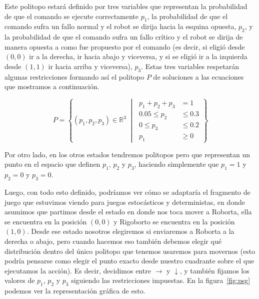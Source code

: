 Este politopo estará definido por tres variables que representan la
probabilidad de que el comando se ejecute correctamente $p_1$, la probabilidad
de que el comando sufra un fallo normal y el robot se dirija hacia la esquina
opuesta, $p_2$, y la probabilidad de que el comando sufra un fallo crítico y el
robot se dirija de manera opuesta a como fue propuesto por el comando (es
decir, si eligió desde $(0,0)$ ir a la derecha, ir hacia abajo y viceversa, y
si se eligió ir a la izquierda desde $(1,1)$ ir hacia arriba y viceversa),
$p_3$. Estas tres variables respetarán algunas restricciones formando así el
politopo $P$ de soluciones a las ecuaciones que mostramos a continuación.

\[
	P = \left\{ (p_1, p_2, p_3) \in \mathbb{R}^3 \;\middle|\;
	\begin{aligned}
		p_1 + p_2 + p_3 &= 1 \\
		0.05 \leq p_2 &\leq 0.3 \\
		0 \leq p_3 &\leq 0.2 \\
		p_1 &\geq 0
	\end{aligned}
	\right\}
\]

Por otro lado, en los otros estados tendremos politopos pero que representan un
punto en el espacio que definen $p_1$, $p_2$ y $p_3$, haciendo simplemente que
$p_1 = 1$ y $p_2 = 0$ y $p_3 = 0$.

Luego, con todo esto definido, podríamos ver cómo se adaptaría el fragmento de
juego que estuvimos viendo para juegos estocásticos y deterministas, en donde
asumimos que partimos desde el estado en donde nos toca mover a Roborta, ella
se encuentra en la posición $(0,0)$ y Rigoborto se encuentra en la posición
$(1,0)$. Desde ese estado nosotros elegiremos si enviaremos a Roborta a la
derecha o abajo, pero cuando hacemos eso también debemos elegir qué
distribución dentro del único politopo que tenemos usaremos para movernos (esto
podría pensarse como elegir el punto exacto desde nuestro cuadrante sobre el
que ejecutamos la acción). Es decir, decidimos entre $\rightarrow$ y
$\downarrow$, y también fijamos los valores de $p_1$, $p_2$ y $p_3$ siguiendo
las restricciones impuestas. En la figura~\ref{fig:psg} podemos ver la
representación gráfica de esto.

